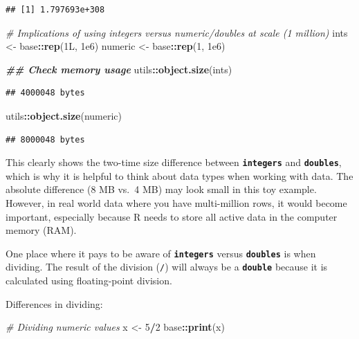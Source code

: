 \documentclass[
]{book}
\newenvironment{Shaded}{\begin{snugshade}}{\end{snugshade}}
\newcommand{\CommentTok}[1]{\textcolor[rgb]{0.56,0.35,0.01}{\textit{#1}}}
\newcommand{\DataTypeTok}[1]{\textcolor[rgb]{0.13,0.29,0.53}{#1}}
\newcommand{\DecValTok}[1]{\textcolor[rgb]{0.00,0.00,0.81}{#1}}
\newcommand{\DocumentationTok}[1]{\textcolor[rgb]{0.56,0.35,0.01}{\textbf{\textit{#1}}}}
\newcommand{\FloatTok}[1]{\textcolor[rgb]{0.00,0.00,0.81}{#1}}
\newcommand{\FunctionTok}[1]{\textcolor[rgb]{0.13,0.29,0.53}{\textbf{#1}}}
\newcommand{\NormalTok}[1]{#1}
\newcommand{\OtherTok}[1]{\textcolor[rgb]{0.56,0.35,0.01}{#1}}
\newcommand{\SpecialCharTok}[1]{\textcolor[rgb]{0.81,0.36,0.00}{\textbf{#1}}}
\begin{document}
\begin{verbatim}
## [1] 1.797693e+308
\end{verbatim}

\begin{Shaded}
\begin{Highlighting}[]
\CommentTok{\# Implications of using integers versus numeric/doubles at scale (1 million)}
\NormalTok{ints }\OtherTok{\textless{}{-}}\NormalTok{ base}\SpecialCharTok{::}\FunctionTok{rep}\NormalTok{(}\DecValTok{1}\DataTypeTok{L}\NormalTok{, }\FloatTok{1e6}\NormalTok{)}
\NormalTok{numeric }\OtherTok{\textless{}{-}}\NormalTok{ base}\SpecialCharTok{::}\FunctionTok{rep}\NormalTok{(}\DecValTok{1}\NormalTok{, }\FloatTok{1e6}\NormalTok{)}

\DocumentationTok{\#\# Check memory usage }
\NormalTok{utils}\SpecialCharTok{::}\FunctionTok{object.size}\NormalTok{(ints)}
\end{Highlighting}
\end{Shaded}

\begin{verbatim}
## 4000048 bytes
\end{verbatim}

\begin{Shaded}
\begin{Highlighting}[]
\NormalTok{utils}\SpecialCharTok{::}\FunctionTok{object.size}\NormalTok{(numeric)}
\end{Highlighting}
\end{Shaded}

\begin{verbatim}
## 8000048 bytes
\end{verbatim}

This clearly shows the two-time size difference between \textbf{\texttt{integers}} and \textbf{\texttt{doubles}}, which is why it is helpful to think about data types when working with data. The absolute difference (8 MB vs.~4 MB) may look small in this toy example. However, in real world data where you have multi-million rows, it would become important, especially because R needs to store all active data in the computer memory (RAM).

One place where it pays to be aware of \textbf{\texttt{integers}} versus \textbf{\texttt{doubles}} is when dividing. The result of the division (\texttt{/}) will always be a \textbf{\texttt{double}} because it is calculated using floating-point division.

Differences in dividing:

\begin{Shaded}
\begin{Highlighting}[]
\CommentTok{\# Dividing numeric values }
\NormalTok{x }\OtherTok{\textless{}{-}} \DecValTok{5}\SpecialCharTok{/}\DecValTok{2}
\NormalTok{base}\SpecialCharTok{::}\FunctionTok{print}\NormalTok{(x)}
\end{Highlighting}
\end{Shaded}
\end{document}
